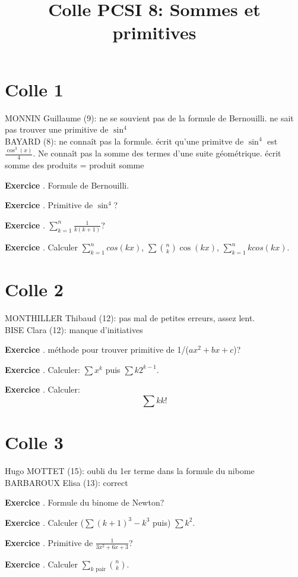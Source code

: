 \documentclass[10pt,a4paper]{article}
\title{Colle PCSI 8: Sommes et primitives}
\newcounter{question}
\newcounter{exo}
\newenvironment{exo}{\vspace{0.5cm}\setcounter{question}{0}\addtocounter{exo}{1} \noindent \textbf{Exercice \theexo}. \normalsize }{\par}
\begin{document}
	\maketitle

	\section*{Colle 1}
	MONNIN Guillaume (9): ne se souvient pas de la formule de Bernouilli. ne sait pas trouver une primitive de $\sin^4$\\
	BAYARD (8): ne connaît pas la formule. écrit qu'une primitve de $\sin^4$ est $\frac{\cos^3(x)}{4}$. Ne connaît pas la somme des termes d'une suite géométrique. écrit somme des produits = produit somme
	\begin{exo}
		Formule de Bernouilli.
	\end{exo}
	
	\begin{exo}
		Primitive de $\sin^4$?
	\end{exo}

	\begin{exo}
		$\sum_{k=1}^{n} \frac{1}{k(k+1)}$?
	\end{exo}
	\begin{exo}
		Calculer $\sum_{k=1}^{n} cos(k x)$, $\sum \binom{n}{k} \cos(kx)$, $\sum_{k=1}^{n} k cos(k x)$.
	\end{exo}	
	
	\section*{Colle 2}
	\setcounter{exo}{0}
	MONTHILLER Thibaud (12): pas mal de petites erreurs, assez lent.\\
	BISE Clara (12): manque d'initiatives\\
	
	\begin{exo}
		méthode pour trouver primitive de 1/($ax^2 + bx + c$)?
	\end{exo}
	
	\begin{exo}
		Calculer: $\sum x^{k}$ puis $\sum k 2^{k-1}$. 
	\end{exo}

	\begin{exo}
		Calculer: 
		$$\sum k k!$$ 
	\end{exo}	
	\section*{Colle 3}
	\setcounter{exo}{0}
	Hugo MOTTET (15): oubli du 1er terme dans la formule du nibome\\
	BARBAROUX Elisa (13): correct\\
	
	\begin{exo}
		Formule du binome de Newton?
	\end{exo}
	\begin{exo}
		Calculer ($\sum (k+1)^3 - k^3$ puis) $\sum k^2$.
	\end{exo}

	\begin{exo}
		Primitive de $\frac{1}{3x^2+6x+3}$?
	\end{exo}
	
	\begin{exo}
		Calculer $\sum_{k\text{ pair}} \binom{n}{k}$.
	\end{exo}
\end{document}
